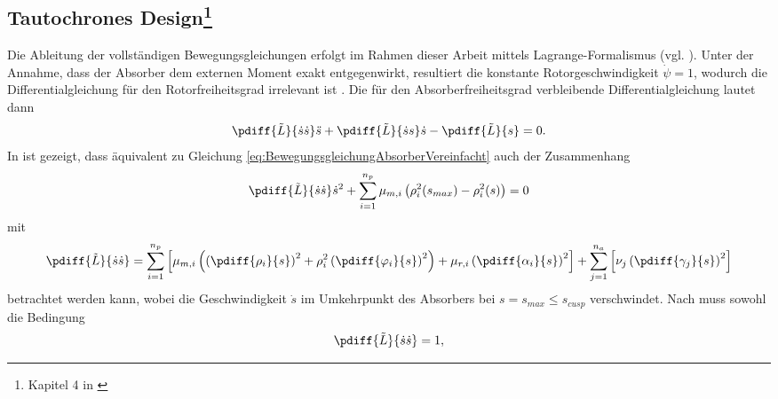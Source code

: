 \subsection[Tautochrones Design]{Tautochrones Design\footnote{Kapitel 4 in \cite{Mayet:Tautochronic}}} \label{subsec:TautDesignBedingungen}
%
Die Ableitung der vollständigen Bewegungsgleichungen erfolgt im Rahmen dieser Arbeit mittels Lagrange-Formalismus (vgl. ).
Unter der Annahme, dass der Absorber dem externen Moment exakt entgegenwirkt, resultiert die 
konstante Rotorgeschwindigkeit $\dot{\psi} = 1$, wodurch die Differentialgleichung für den Rotorfreiheitsgrad irrelevant ist \cite{Mayet:Tautochronic}. 
Die für den Absorberfreiheitsgrad  verbleibende Differentialgleichung  lautet dann
\begin{equation}
		\pdiff{\tilde{L}}{{\dot{s}}{\dot{s}}} \ddot{s} + \pdiff{\tilde{L}}{{\dot{s}}{s}} \dot{s}  - \pdiff{\tilde{L}}{{s}}= 0.
		\label{eq:BewegungsgleichungAbsorberVereinfacht}
\end{equation}
%
%
%
%
%
In \cite[Anhang A]{Mayet:Tautochronic} ist gezeigt, dass äquivalent zu Gleichung \eqref{eq:BewegungsgleichungAbsorberVereinfacht} auch der
Zusammenhang
\begin{equation}
		\pdiff{\tilde{L}}{{\dot{s}}{\dot{s}}} \dot{s}^2 + \sum_{i=1}^{n_p}{ \mu_{m,i} \left( \rho_i^2(s_{max}) - \rho_i^2(s) \right) } = 0
		\label{eq:BewegungsgleichungAbsorberAndereBetrachtungsweise}
\end{equation}
mit
%
%
\begin{equation}
		\pdiff{\tilde{L}}{{\dot{s}}{\dot{s}}} =
		\sum^{n_p}_{i=1}    {   \left[    \mu_{m,i} \left( \left(\pdiff{\rho_i}{s}\right)^2 +  \rho_i^2 \left(\pdiff{\varphi_i}{s}\right)^2  \right)  + \mu_{r,i} \left(\pdiff{\alpha_i}{s}\right)^2  \right]       } 
		+ \sum^{n_a}_{j=1}   {\left[ \nu_j \left( \pdiff{\gamma_j}{s} \right)^2  \right]} 
		\label{eq:BewegungsgleichungAbsorber2teAbleitungNachsPunktexplizit}
\end{equation}
betrachtet werden kann, wobei die Geschwindigkeit $\dot{s}$ im Umkehrpunkt des Absorbers bei $s = s_{max} \leq s_{cusp}$ verschwindet. 
%
%
%
%
Nach \cite{Mayet:Tautochronic} muss sowohl die Bedingung
\begin{equation}
		\pdiff{\tilde{L}}{{\dot{s}}{\dot{s}}} = 1,
		\label{eq:TautochronerAbsorberentwurfGeometrischeZwangsbedingung}
\end{equation}
